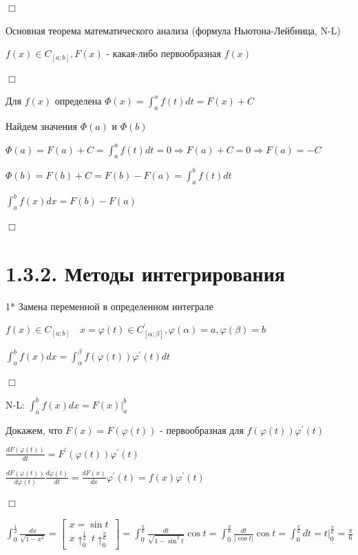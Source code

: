 \documentclass[12pt]{article}
\begin{document}
    $\Box$

    \Th \hypertarget{formulanewtonleibniz}{Основная теорема математического анализа} (формула Ньютона-Лейбница, N-L)

    $f(x) \in C_{[a;b]}, F(x)$ - какая-либо первообразная $f(x)$


    $\Box$

    Для $f(x)$ определена $\Phi(x) = \int_a^x f(t)dt = F(x) + C$

    Найдем значения $\Phi(a)$ и $\Phi(b)$

    $\Phi(a) = F(a) + C = \int^a_a f(t)dt = 0 \Longrightarrow F(a) + C = 0 \Longrightarrow F(a) = -C$

    $\Phi(b) = F(b) + C = F(b) - F(a) = \int^b_a f(t) dt$

    $\int^b_a f(x)dx = F(b) - F(a)$

    $\Box$


    \section{1.3.2. Методы интегрирования}

    1* \hypertarget{integralsubstitution}{Замена переменной в определенном интеграле}

    \Th $f(x) \in C_{[a;b]} \quad x = \varphi(t) \in C^\prime_{[\alpha;\beta]}, \varphi(\alpha) = a, \varphi(\beta) = b$

    $\int^b_a f(x)dx = \int^\beta_\alpha f(\varphi(t)) \varphi^\prime(t) dt$

    $\Box$

    N-L: $\int^b_a f(x)dx = F(x) \Big|_a^b$

    Докажем, что $F(x) = F(\varphi(t))$ - первообразная для $f(\varphi(t))\varphi^\prime(t)$

    $\frac{dF(\varphi(t))}{dt} = F^\prime(\varphi(t)) \varphi^\prime(t)$

    $\frac{dF(\varphi(t))}{d\varphi(t)}\frac{d\varphi(t)}{dt} = \frac{dF(x)}{dx} \varphi^\prime(t) = f(x)\varphi^\prime(t)$

    $\Box$

    \Ex $\int_0^{\frac{1}{2}} \frac{dx}{\sqrt{1 - x^2}} = \begin{bmatrix}
                                                              x = \sin t \\ x \uparrow^\frac{1}{2}_0 \ t \uparrow_0^\frac{\pi}{6}
    \end{bmatrix} =
    \int_0^\frac{\pi}{6} \frac{dt}{\sqrt{1 - \sin^2 t}}\cos t =
    \int_0^\frac{\pi}{6} \frac{dt}{|\cos t|} \cos t = \int_0^\frac{\pi}{6} dt = t \Big|_0^\frac{\pi}{6} = \frac{\pi}{6}$
\end{document}
